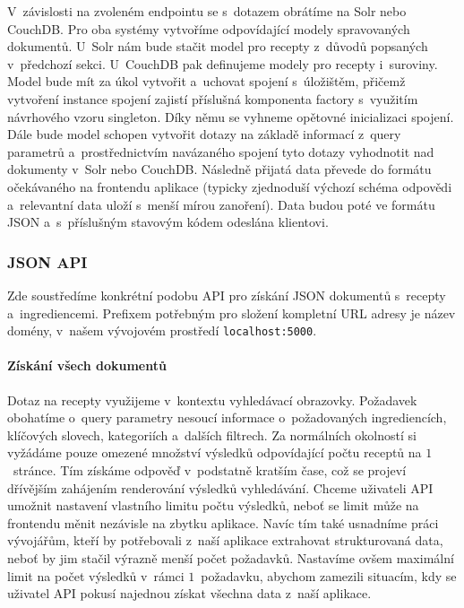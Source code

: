 V~závislosti na zvoleném endpointu se s~dotazem obrátíme na Solr nebo \,CouchDB. Pro oba systémy vytvoříme odpovídající modely spravovaných dokumentů. U~Solr nám bude stačit model pro recepty z~důvodů popsaných v~předchozí sekci. U~CouchDB pak definujeme modely pro recepty i~suroviny. Model bude mít za úkol vytvořit a~uchovat spojení s~úložištěm, přičemž vytvoření instance spojení zajistí příslušná komponenta factory s~využitím návrhového vzoru singleton. Díky němu se vyhneme opětovné inicializaci spojení. Dále bude model schopen vytvořit dotazy na základě informací z~query parametrů a~prostřednictvím navázaného spojení tyto dotazy vyhodnotit nad dokumenty v~Solr nebo CouchDB. Následně přijatá data převede do formátu očekávaného na frontendu aplikace (typicky zjednoduší výchozí schéma odpovědi a~relevantní data uloží s~menší mírou zanoření). Data budou poté ve formátu JSON a~s~příslušným stavovým kódem odeslána klientovi. 

\subsubsection{JSON API}

Zde soustředíme konkrétní podobu API pro získání JSON dokumentů s~recepty a~ingrediencemi. Prefixem potřebným pro složení kompletní URL adresy je název domény, v~našem vývojovém prostředí \texttt{localhost:5000}.

\paragraph{Získání všech dokumentů}

Dotaz na recepty využijeme v~kontextu vyhledávací obrazovky. Požadavek obohatíme o~query parametry nesoucí informace o~požadovaných ingrediencích, klíčových slovech, kategoriích a~dalších filtrech. Za normálních okolností si vyžádáme pouze omezené množství výsledků odpovídající počtu receptů na $1$~stránce. Tím získáme odpověď v~podstatně kratším čase, což se projeví dřívějším zahájením renderování výsledků vyhledávání. Chceme uživateli API umožnit nastavení vlastního limitu počtu výsledků, neboť se limit může na frontendu měnit nezávisle na zbytku aplikace. Navíc tím také usnadníme práci vývojářům, kteří by potřebovali z~naší aplikace extrahovat strukturovaná data, neboť by jim stačil výrazně menší počet požadavků. Nastavíme ovšem maximální limit na počet výsledků v~rámci $1$~požadavku, abychom zamezili situacím, kdy se uživatel API pokusí najednou získat všechna data z~naší aplikace.

